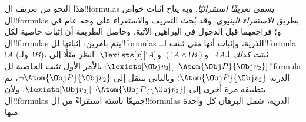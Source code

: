 \documentclass[../../../include/open-logic-section]{subfiles}
\begin{document}
هذا النحو من تعريف ال!!{formula}s يسمى \emph{تعريفًا استقرائيًا}.
وبه يتاح إثبات خواص ال!!{formula}s بطريق \emph{الاستقراء البنيوي}.
وقد بُحث التعريف والاستقراء على وجه عام في
 و؛
فراجعهما قبل الدخول في البراهين الآتية. وحاصل الطريقة أن إثبات
خاصية لكل ال!!{formula}s يتم بأمرين: إثباتها لل!!{formula}s
الذرية، وإثبات أنها \emph{متى} ثبتت لــ!!{formula}~$!A$
(ولـ~$!B$)، ثبتت \emph{كذلك} لـ$\lnot !A$ و$(!A \land !B)$
و$\lexists[x][!A]$. انظر مثلًا إلى
$\lexists[\Obj v_2][\lnot \Atom{\Obj P}{\Obj v_2}]$:
بالأمر الأول تثبت الخاصية لل!!{formula} الذرية
$\Atom{\Obj P}{\Obj v_2}$؛ وبالثاني تنتقل إلى
$\lnot \Atom{\Obj P}{\Obj v_2}$، ثم بتطبيقه مرة أخرى إلى
$\lexists[\Obj v_2][\lnot \Atom{\Obj P}{\Obj v_2}]$.
ولأن ال!!{formula}s جميعًا ناشئة استقراءً من ال!!{formula}s
الذرية، شمل البرهان كل واحدة منها.
\end{document}
